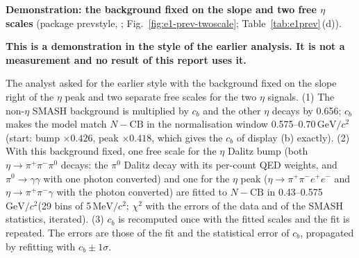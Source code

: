 \documentclass[11pt,a4paper]{article}
\newcommand{\piz}{\ensuremath{\pi^{0}}\xspace}
\newcommand{\pipi}{\ensuremath{\pi^{+}\pi^{-}}\xspace}
\newcommand{\ppee}{\ensuremath{\pi^{+}\pi^{-}e^{+}e^{-}}\xspace}
\newcommand{\GeVcc}{\ensuremath{\mathrm{GeV}/c^{2}}\xspace}
\newcommand{\MeVcc}{\ensuremath{\mathrm{MeV}/c^{2}}\xspace}
\newcommand{\code}[1]{\texttt{\detokenize{#1}}}
\newcommand{\notebox}[1]{\par\noindent\colorbox{orange!10}{\parbox{\dimexpr\linewidth-2\fboxsep\relax}{#1}}\par}
\begin{document}
\textbf{Demonstration: the background fixed on the slope and two free $\eta$ scales} (package prevstyle, \code{prevstyle_twoscale.py};
Fig.~\ref{fig:e1-prev-twoscale}; Table~\ref{tab:e1prev}\,(d)).
\notebox{\textbf{This is a demonstration in the style of the earlier analysis. It is not a measurement and no result of this report uses it.}}
The analyst asked for the earlier style with the background fixed on the slope right of the $\eta$ peak and two separate free scales for the two
$\eta$ signals. (1) The non-$\eta$ SMASH background is multiplied by $c_b$ and the other $\eta$ decays by 0.656; $c_b$ makes the model match
$N-\mathrm{CB}$ in the normalisation window 0.575--0.70\,\GeVcc (start: bump $\times0.426$, peak $\times0.418$, which gives the $c_b$ of
display (b) exactly). (2) With this background fixed, one free scale for the $\eta$ Dalitz bump (both $\eta\to\pipi\piz$ decays: the \piz
Dalitz decay with its per-count QED weights, and $\piz\to\gamma\gamma$ with one photon converted) and one for the $\eta$ peak ($\eta\to\ppee$
and $\eta\to\pipi\gamma$ with the photon converted) are fitted to $N-\mathrm{CB}$ in 0.43--0.575\,\GeVcc (29 bins of 5\,\MeVcc; $\chi^2$ with
the errors of the data and of the SMASH statistics, iterated). (3) $c_b$ is recomputed once with the fitted scales and the fit is repeated.
The errors are those of the fit and the statistical error of $c_b$, propagated by refitting with $c_b\pm1\sigma$.
\end{document}
